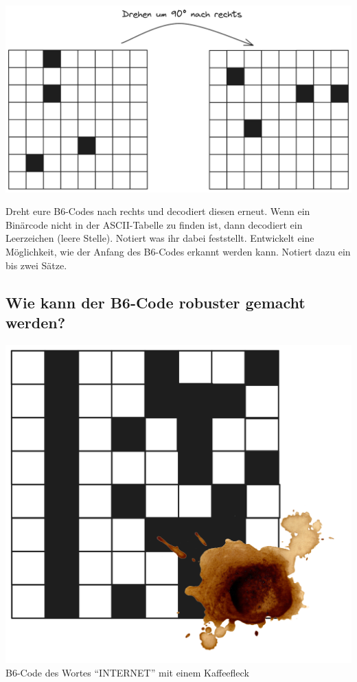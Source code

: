 \documentclass[a5paper]{scrartcl}
\begin{document}
\begin{center}
	\includegraphics[width=0.9\linewidth]{./b6code-drehen.excalidraw.png}

\end{center}
\begin{aufgabe}
	\begin{teilaufgaben}
    \teilaufgabe {} Dreht eure B6-Codes nach rechts und decodiert diesen erneut. Wenn ein Binärcode nicht in der ASCII-Tabelle zu finden ist, dann decodiert ein Leerzeichen (leere Stelle). Notiert was ihr dabei feststellt.
		\teilaufgabe {} Entwickelt eine Möglichkeit, wie der Anfang des B6-Codes erkannt werden kann. Notiert dazu ein bis zwei Sätze.
	\end{teilaufgaben}
\end{aufgabe}

\newpage

\subsection*{Wie kann der B6-Code robuster gemacht werden?}

\begin{center}
	\includegraphics[width=0.9\linewidth]{./b6code-fehler.excalidraw.png}
  \footnotesize{B6-Code des Wortes \enquote{INTERNET} mit einem Kaffeefleck}
\end{center}
\end{document}
